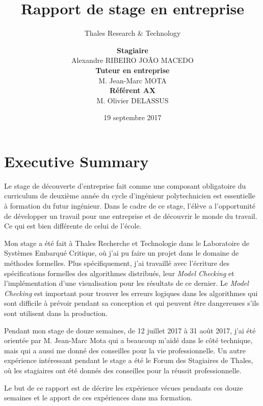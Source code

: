 \documentclass[a4paper, 12pt]{article} %
\begin{document}
\title{Rapport de stage en entreprise}
\subtitle{Thales Research \& Technology}
\author{
\begin{tabular}{ccc}
	\textbf{Stagiaire}
	\\
	Alexandre RIBEIRO JOÃO MACEDO
	\\	
	\textbf{Tuteur en entreprise} 
	\\
	M. Jean-Marc MOTA
	\\
	\textbf{Référent AX}
	\\
	M. Olivier DELASSUS
\end{tabular}
}
\date{19 septembre 2017}
\maketitle

\section{Executive Summary}
Le stage de découverte d'entreprise fait comme une composant obligatoire du curriculum de deuxième année du cycle d'ingénieur polytechnicien est essentielle à formation du futur ingénieur. Dans le cadre de ce stage, l'élève a l'opportunité de développer un travail pour une entreprise et de découvrir le monde du travail. Ce qui est bien différente de celui de l'école.

Mon stage a été fait à Thales Recherche et Technologie dans le Laboratoire de Systèmes Embarqué Critique, où j'ai pu faire un projet dans le domaine de méthodes formelles. Plus spécifiquement, j'ai travaillé avec l'écriture des spécifications formelles des algorithmes distribués, leur \textit{Model Checking} et l'implémentation d'une visualisation pour les résultats de ce dernier. Le \textit{Model Checking} est important pour trouver les erreurs logiques dans les algorithmes qui sont difficile à prévoir pendant sa conception et qui peuvent être dangereuses s'ils sont utilisent dans la production.

Pendant mon stage de douze semaines, de 12 juillet 2017 à 31 août 2017, j'ai été orientée par M. Jean-Marc Mota qui a beaucoup m'aidé dans le côté technique, mais qui a aussi me donné des conseilles pour la vie professionnelle. Un autre expérience intéressant pendant le stage a été le Forum des Stagiaires de Thales, où les stagiaires ont été donnés des conseilles pour la réussit professionnelle.

Le but de ce rapport est de décrire les expérience vécues pendants ces douze semaines et le apport de ces expériences dans ma formation.
\end{document}
